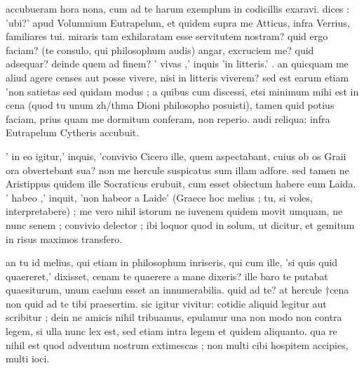 


 accubueram hora nona, cum ad te harum exemplum in codicillis exaravi. dices : 'ubi?' apud Volumnium Eutrapelum, et quidem supra me Atticus, infra Verrius, familiares tui. miraris tam exhilaratam esse servitutem nostram? quid ergo faciam? (te consulo, qui philosophum audis) angar, excruciem me? quid adsequar? deinde quem ad finem? ' vivas ,' inquis 'in litteris.' . an quicquam me aliud agere censes aut posse vivere, nisi in litteris viverem? sed est earum etiam 'non satietas sed quidam modus ; a quibus cum discessi, etsi minimum mihi est in cena (quod tu unum zh/thma Dioni philosopho posuisti), tamen quid potius faciam, prius quam me dormitum conferam, non reperio. audi reliqua: infra Eutrapelum Cytheris accubuit.

 ' in eo igitur,' inquis, 'convivio Cicero ille, quem aspectabant, cuius ob os Graii ora obvertebant sua? non me hercule suspicatus sum illam adfore. sed tamen ne Aristippus quidem ille Socraticus erubuit, cum esset obiectum habere eum Laida. ' habeo ,' inquit, 'non habeor a Laide' (Graece hoc melius ; tu, si voles, interpretabere) ; me vero nihil istorum ne iuvenem quidem movit umquam, ne nunc senem ; convivio delector ; ibi loquor quod in solum, ut dicitur, et gemitum in risus maximos transfero.

 an tu id melius, qui etiam in philosophum inriseris, qui cum ille, 'si quis quid quaereret,' dixisset, cenam te quaerere a mane dixeris? ille baro te putabat quaesiturum, unum caelum esset an innumerabilia. quid ad te? at hercule †cena non quid ad te tibi praesertim. sic igitur vivitur: cotidie aliquid legitur aut scribitur ; dein ne amicis nihil tribuamus, epulamur una non modo non contra legem, si ulla nunc lex est, sed etiam intra legem et quidem aliquanto. qua re nihil est quod adventum nostrum extimescas ; non multi cibi hospitem accipies, multi ioci.
